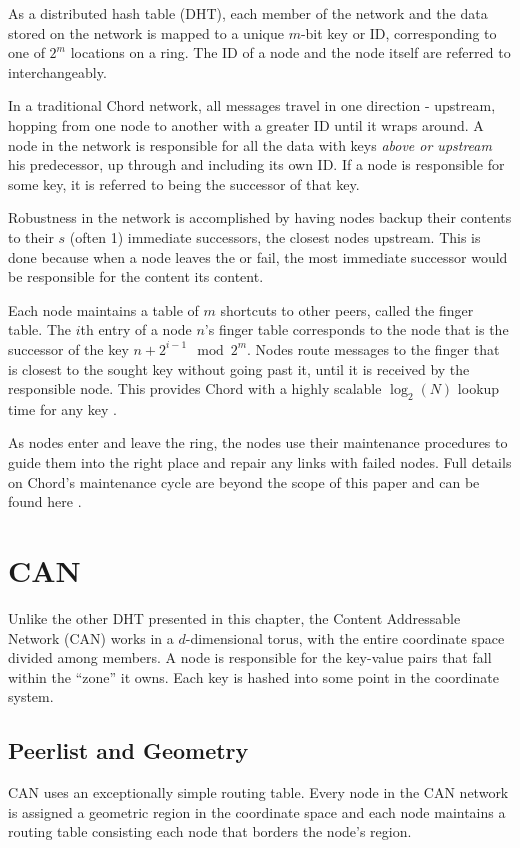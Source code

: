 \documentclass[10pt,letterpaper]{report}
\begin{document}
As a distributed hash table (DHT), each member of the network and the data stored on the network is mapped to a unique $m$-bit key or ID, corresponding to one of  $2^m$ locations on a ring. 
The ID of a node and the node itself are referred to interchangeably.

In a traditional Chord network, all messages travel in one direction - upstream, hopping from one node to another with a greater ID until it wraps around.
A node in the network is responsible for all the data with keys \textit{above or upstream} his predecessor, up through and including its own ID.  If a node is responsible for some key, it is referred to being the successor of that key.

Robustness in the network is accomplished by having nodes backup their contents to their $s$ (often 1) immediate successors, the closest nodes upstream.  
This is done because when a node leaves the or fail, the most immediate successor would be responsible for the content its content.

Each node maintains a table of $m$ shortcuts to other peers, called the finger table.   The $i$th entry of a node $n$'s finger table corresponds to the node that is the successor of the key $n+2^{i-1} \mod 2^m $.  Nodes route messages to the finger that is closest to the sought key without going past it, until it is received by the responsible node.  This provides Chord with a highly scalable $\log_2(N)$ lookup time for any key \cite{chord}.

As nodes enter and leave the ring, the nodes use their maintenance procedures to guide them into the right place and repair any links with failed nodes.  Full details on Chord's maintenance cycle are beyond the scope of this paper and can be found here \cite{chord}.


\section{CAN}
Unlike the other DHT presented in this chapter, the Content Addressable Network (CAN) \cite{can} works in a $d$-dimensional torus, with the entire coordinate space divided among members.
A node is responsible for the key-value pairs that fall within the ``zone'' it owns.
Each key is hashed into some point in the coordinate system.

\subsection*{Peerlist and Geometry}
CAN uses an exceptionally simple routing table.  
Every node in the CAN network is assigned a geometric region in the coordinate space and each node maintains a routing table consisting each node that borders the node's region.
\end{document}
